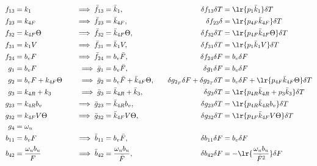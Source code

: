 \begin{align*}
    f_{13} &= k_1 \quad&
    \implies \bar f_{13} &= \bar k_{1}, \quad&
    \delta f_{13} \delta T &= \lr{ p_{1} \bar k_{1} } \delta T\\
    f_{23} &= k_{4F} \quad &
    \implies \bar f_{23} &= \bar k_{4F}, \quad &
    \delta f_{23} \delta &= \lr{ p_{4F} \bar k_{4F} } \delta T\\
    f_{32} &= k_{4F} \Theta \quad &
    \implies \bar f_{32} &= \bar k_{4F} \Theta, \quad &
    \delta f_{32} \delta T &= \lr{ p_{4F}  \bar k_{4F} \Theta } \delta T
    \\
    f_{31} &= k_1 V \quad &
    \implies \bar f_{31} &= \bar k_1 V, \quad &
    \delta f_{31} \delta T &= \lr{ p_1 \bar k_1 V } \delta T
    \\
    f_{24} &= b_v F
    \quad &
    \implies \bar f_{24} &= b_v \bar F,
    \quad &
    \delta f_{24} \delta F &= b_v \delta F
    \\
    g_1    &= b_v F
    \quad &
    \implies \bar g_1 &= b_v \bar F,
    \quad &
    \delta g_1 \delta F &= b_v \delta F
    \\
    g_2    &= b_v F + k_{4F} \Theta
    \quad &
    \implies \bar g_2 &= b_v \bar F + \bar k_{4F} \Theta,
    \quad &
    \delta g_{2_F} \delta F + \delta g_{2_T} \delta T &= b_v \delta F +  \lr{ p_{4F}  \bar k_{4F}  \Theta } \delta T
    \\
    g_{3}  &= k_{4R}+k_3
    \quad &
    \implies \bar g_3 &= \bar k_{4R} + \bar k_3,
    \quad &
    \delta g_3 \delta T&= \lr{ p_{4R} \bar k_{4R} + p_3 \bar k_3} \delta T
    \\
    g_{23} &= k_{4R} b_v
    \quad &
    \implies \bar g_{23} &= \bar k_{4R} b_v,
    \quad &
    \delta g_{23} \delta T &= \lr{ p_{4R} \bar k_{4R} b_v } \delta T
    \\
    g_{32} &= k_{4F} V \Theta
    \quad &
    \implies \bar g_{32} &= \bar k_{4F} V \Theta,
    \quad &
    \delta g_{32} \delta T &= \lr{ p_{4F} \bar k_{4F} V \Theta } \delta T
    \\
    g_4 &= \omega_u
    \\
    b_{11} &= b_v F
    \quad &
    \implies \bar b_{11} &= b_v \bar F,
    \quad &
    \delta b_{11} \delta F &= b_v \delta F
    \\
    b_{42} &= \frac{\omega_u b_u}{F}
    \quad &
    \implies \bar b_{42} &= \frac{\omega_u b_u}{\bar F},
    \quad &
    \delta b_{42} \delta F &= -\lr{\frac{\omega_u b_u}{\bar F^2}} \delta F
\end{align*}


